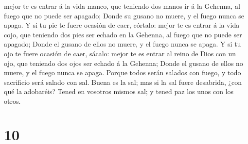 mejor te es entrar á la vida manco, que teniendo dos manos ir á la
Gehenna, al fuego que no puede ser apagado;  Donde su
gusano no muere, y el fuego nunca se apaga.  Y si tu pie te
fuere ocasión de caer, córtalo: mejor te es entrar á la vida cojo, que
teniendo dos pies ser echado en la Gehenna, al fuego que no puede ser
apagado;  Donde el gusano de ellos no muere, y el fuego
nunca se apaga.  Y si tu ojo te fuere ocasión de caer,
sácalo: mejor te es entrar al reino de Dios con un ojo, que teniendo dos
ojos ser echado á la Gehenna;  Donde el gusano de ellos no
muere, y el fuego nunca se apaga.  Porque todos serán
salados con fuego, y todo sacrificio será salado con sal. 
Buena es la sal; mas si la sal fuere desabrida, ¿con qué la adobaréis?
Tened en vosotros mismos sal; y tened paz los unos con los otros.

\hypertarget{section-9}{%
\section{10}\label{section-9}}

